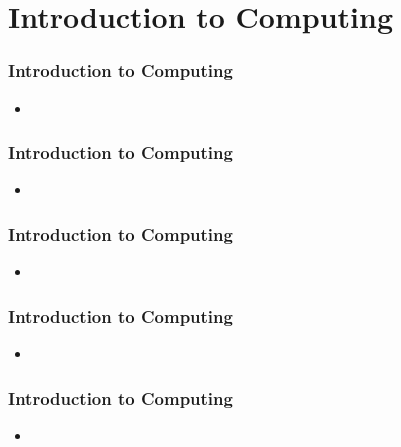 \documentclass[notheorems,mathserif,table,compress]{beamer}  %
\begin{document}
\section{Introduction to Computing}
%
\begin{frame}
\frametitle{Introduction to Computing} 
\begin{itemize}
\item 

\end{itemize}
\end{frame}

%
\begin{frame}
\frametitle{Introduction to Computing}
\begin{itemize}
\item 

\end{itemize}
\end{frame}

%
\begin{frame}
\frametitle{Introduction to Computing}
\begin{itemize}
\item 

\end{itemize}
\end{frame}

%
\begin{frame}
\frametitle{Introduction to Computing}
\begin{itemize}
\item 

\end{itemize}
\end{frame}

%
\begin{frame}
\frametitle{Introduction to Computing} 
\begin{itemize}
\item 

\end{itemize}
\end{frame}
\end{document}
